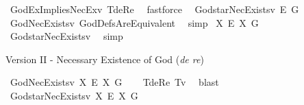 \begin{isabellebody}
\isatagproof
{}\isamarkupfalse%
\ GodExImpliesNecEx{\isacharunderscore}v{}\ T{}{\isacharunderscore}deRe\ \isamarkupfalse%
\ fastforce\ %
%
\endisatagproof
{\isafoldproof}%
%
\isadelimproof
\isanewline
%
\endisadelimproof
{}\isamarkupfalse%
\ God{\isacharunderscore}starNecExists{\isacharunderscore}v{}{\isacharcolon}\ {\isachardoublequoteopen}{\isasymlfloor}\isactrlbold {\isasymbox}\isactrlbold {\isasymexists}\isactrlsup E\ \isactrlbold {\isasymdown}G{\isacharasterisk}{\isasymrfloor}{\isachardoublequoteclose}\isanewline
%
\isadelimproof
\ \ %
\endisadelimproof
%
\isatagproof
{}\isamarkupfalse%
\ GodNecExists{\isacharunderscore}v{}\ GodDefsAreEquivalent\ \isamarkupfalse%
\ simp%
\endisatagproof
{\isafoldproof}%
%
\isadelimproof
\isanewline
%
\endisadelimproof
{}\isamarkupfalse%
\ {\isachardoublequoteopen}{\isasymlfloor}\isactrlbold {\isasymbox}{\isacharparenleft}{\isasymlambda}X{\isachardot}\ \isactrlbold {\isasymexists}\isactrlsup E\ X{\isacharparenright}\ \isactrlbold {\isasymdown}G{\isacharasterisk}{\isasymrfloor}{\isachardoublequoteclose}\isanewline
%
\isadelimproof
\ \ %
\endisadelimproof
%
\isatagproof
{}\isamarkupfalse%
\ God{\isacharunderscore}starNecExists{\isacharunderscore}v{}\ \isamarkupfalse%
\ simp\ %
%
\endisatagproof
{\isafoldproof}%
%
\isadelimproof
%
\endisadelimproof
%
\begin{isamarkuptext}%
Version II - Necessary Existence of God (\emph{de re})%
\end{isamarkuptext}\isamarkuptrue%
\isamarkupfalse%
\ GodNecExists{\isacharunderscore}v{}{\isacharcolon}\ {\isachardoublequoteopen}{\isasymlfloor}{\isacharparenleft}{\isasymlambda}X{\isachardot}\ \isactrlbold {\isasymbox}\isactrlbold {\isasymexists}\isactrlsup E\ X{\isacharparenright}\ \isactrlbold {\isasymdown}G{\isasymrfloor}{\isachardoublequoteclose}\isanewline
%
\isadelimproof
\ \ %
\endisadelimproof
%
\isatagproof
{}\isamarkupfalse%
\ T{}{\isacharunderscore}deRe\ T{}{\isacharunderscore}v{}\ \isamarkupfalse%
\ blast%
\endisatagproof
{\isafoldproof}%
%
\isadelimproof
\isanewline
%
\endisadelimproof
{}\isamarkupfalse%
\ God{\isacharunderscore}starNecExists{\isacharunderscore}v{}{\isacharcolon}\ {\isachardoublequoteopen}{\isasymlfloor}{\isacharparenleft}{\isasymlambda}X{\isachardot}\ \isactrlbold {\isasymbox}\isactrlbold {\isasymexists}\isactrlsup E\ X{\isacharparenright}\ \isactrlbold {\isasymdown}G{\isacharasterisk}{\isasymrfloor}{\isachardoublequoteclose}\isanewline

\end{isabellebody}
